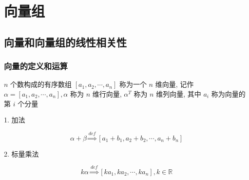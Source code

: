 \chapter{向量组}

\section{向量和向量组的线性相关性}

\subsection{向量的定义和运算}
\begin{definition}[向量的定义]
	$n$ 个数构成的有序数组 $[a_{1},a_{2},\cdots,a_{n}]$ 称为一个 $n$ 维向量, 记作 
	$\alpha=[a_{1},a_{2},\cdots,a_{n}], \alpha$ 称为 $n$ 维行向量,
	$\alpha^{T}$ 称为 $n$ 维列向量, 其中 $a_{i}$ 称为向量的第 $i$ 个分量
\end{definition}
\begin{definition}[向量的线性运算]
	\textcolor{purpleb}{1. 加法}

	$$\alpha+\beta\overset{def}{\Longrightarrow}[a_{1}+b_{1},a_{2}+b_{2},\cdots,a_{n}+b_{n}]$$
	
	\textcolor{purpleb}{2. 标量乘法}

	$$k\alpha\overset{def}{\Longrightarrow}[ka_{1},ka_{2},\cdots,ka_{n}], k\in \mathbb{R}$$
	
\end{definition}
